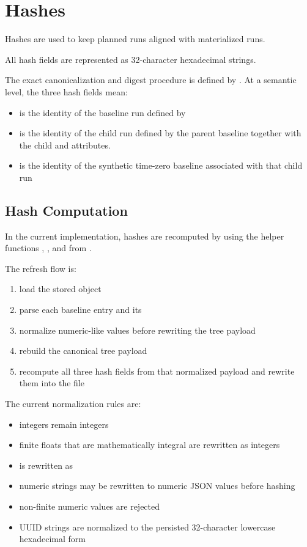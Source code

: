 \documentclass[11pt]{article}
\begin{document}
\section*{Hashes}

Hashes are used to keep planned runs aligned with materialized runs.

All hash fields are represented as 32-character hexadecimal strings.

The exact canonicalization and digest procedure is defined by .
At a semantic level, the three hash fields mean:

\begin{itemize}
\item {} is the identity of the baseline run defined by 
\item {} is the identity of the child run defined by the parent baseline together with the child  and  attributes.
\item {} is the identity of the synthetic time-zero baseline associated with that child run
\end{itemize}

\subsection*{Hash Computation}

In the current implementation, hashes are recomputed by
 using the helper functions
, , and
 from
.

The refresh flow is:
\begin{enumerate}
\item load the stored  object
\item parse each baseline entry and its 
\item normalize numeric-like values before rewriting the tree payload
\item rebuild the canonical tree payload
\item recompute all three hash fields from that normalized payload and rewrite them into the file
\end{enumerate}

The current normalization rules are:
\begin{itemize}
\item integers remain integers
\item finite floats that are mathematically integral are rewritten as integers
\item {} is rewritten as 
\item numeric strings may be rewritten to numeric JSON values before hashing
\item non-finite numeric values are rejected
\item UUID strings are normalized to the persisted 32-character lowercase hexadecimal form
\end{itemize}
\end{document}
